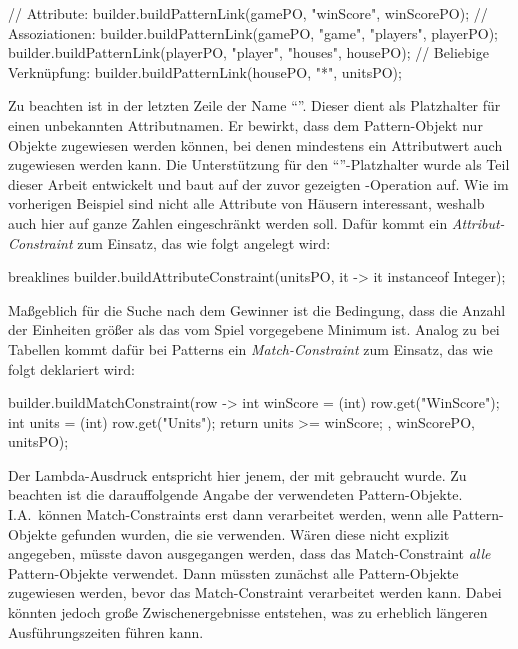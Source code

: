 \begin{jcodeblock}
    // Attribute:
    builder.buildPatternLink(gamePO, "winScore", winScorePO);
    // Assoziationen:
    builder.buildPatternLink(gamePO, "game", "players", playerPO);
    builder.buildPatternLink(playerPO, "player", "houses", housePO);
    // Beliebige Verknüpfung:
    builder.buildPatternLink(housePO, "*", unitsPO);
\end{jcodeblock}

Zu beachten ist in der letzten Zeile der Name ``\code{*}''.
Dieser dient als Platzhalter für einen unbekannten Attributnamen.
Er bewirkt, dass dem Pattern-Objekt  nur Objekte zugewiesen werden können, bei denen mindestens ein Attributwert auch  zugewiesen werden kann.
Die Unterstützung für den  ``\code{*}''-Platzhalter wurde als Teil dieser Arbeit entwickelt und baut auf der zuvor gezeigten -Operation auf.
Wie im vorherigen Beispiel sind nicht alle Attribute von Häusern interessant, weshalb auch hier auf ganze Zahlen eingeschränkt werden soll.
Dafür kommt ein \emph{Attribut-Constraint} zum Einsatz, das wie folgt angelegt wird:

\begin{jcodeblock*}{breaklines}
    builder.buildAttributeConstraint(unitsPO, it -> it instanceof Integer);
\end{jcodeblock*}

Maßgeblich für die Suche nach dem Gewinner ist die Bedingung, dass die Anzahl der Einheiten größer als das vom Spiel vorgegebene Minimum ist.
Analog zu  bei Tabellen kommt dafür bei Patterns ein \emph{Match-Constraint} zum Einsatz, das wie folgt deklariert wird:

\begin{jcodeblock}
    builder.buildMatchConstraint(row -> {
        int winScore = (int) row.get("WinScore");
        int units = (int) row.get("Units");
        return units >= winScore;
    }, winScorePO, unitsPO);
\end{jcodeblock}

Der Lambda-Ausdruck entspricht hier jenem, der mit  gebraucht wurde.
Zu beachten ist die darauffolgende Angabe der verwendeten Pattern-Objekte.
I.A.\ können Match-Constraints erst dann verarbeitet werden, wenn alle Pattern-Objekte gefunden wurden, die sie verwenden.
Wären diese nicht explizit angegeben, müsste davon ausgegangen werden, dass das Match-Constraint \emph{alle} Pattern-Objekte verwendet.
Dann müssten zunächst alle Pattern-Objekte zugewiesen werden, bevor das Match-Constraint verarbeitet werden kann.
Dabei könnten jedoch große Zwischenergebnisse entstehen, was zu erheblich längeren Ausführungszeiten führen kann.

